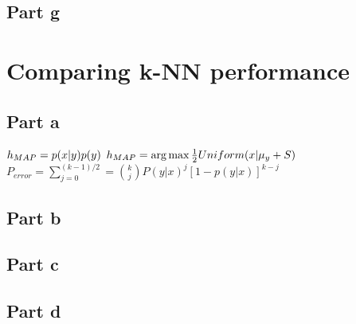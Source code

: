 \documentclass[paper=a4, fontsize=11pt]{scrartcl} %
\numberwithin{equation}{section} %
\numberwithin{figure}{section} %
\numberwithin{table}{section} %
\begin{document}
	\subsection{Part g}
		
	
	\section{Comparing k-NN performance}
	
	\subsection{Part a}	
	$h_{MAP} = p(x|y)p(y)\\\\$
	$h_{MAP} = \arg\max\frac{1}{2}Uniform(x|\mu_y+S)\\\\\\\\$
	$P_{error} = \sum_{j=0}^{(k-1)/2} = {k \choose j} P(y|x)^j[1-p(y|x)]^{k-j}$
	
	\subsection{Part b}
	
	\subsection{Part c}
	
	\subsection{Part d}
\end{document}

